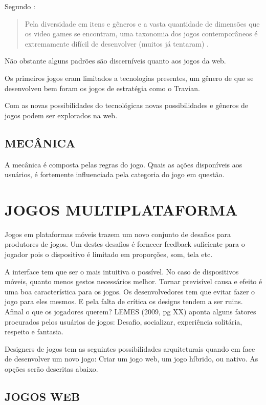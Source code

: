 Segundo \cite[pp. 60]{gamebenefits}:
\begin{quote}
Pela diversidade em itens e gêneros e a vasta quantidade de dimensões
que os video games se encontram, uma taxonomia dos jogos contemporâneos
é extremamente difícil de desenvolver (muitos já tentaram) .
\end{quote}

Não obstante alguns padrões são discerníveis quanto aos jogos da
web.

Os primeiros jogos eram limitados a tecnologias presentes, um gênero de
que se desenvolveu bem foram os jogos de estratégia como o Travian.

Com as novas possibilidades do tecnológicas novas possibilidades e
gêneros de jogos podem ser explorados na web.

\subsection{MECÂNICA}

A mecânica é composta pelas regras do jogo. Quais as ações
disponíveis aos usuários, é fortemente influenciada pela categoria do
jogo em questão.

\section{JOGOS MULTIPLATAFORMA}

Jogos em plataformas móveis trazem um novo conjunto de desafios para
produtores de jogos. Um destes desafios é fornecer feedback suficiente
para o jogador pois o dispositivo é limitado em proporções, som, tela
etc.

A interface tem que ser o mais intuitiva o possível. No caso de
dispositivos móveis, quanto menos gestos necessários melhor. Tornar
previsível causa e efeito é uma boa característica para os jogos.
Os desenvolvedores tem que evitar fazer o jogo para eles mesmos.
E pela falta de crítica os designs tendem a ser ruins. Afinal o
que os jogadores querem? LEMES (2009, pg XX) aponta alguns fatores procurados
pelos usuários de jogos: Desafio, socializar, experiência solitária,
respeito e fantasia.

Designers de jogos tem as seguintes possibilidades arquiteturais
quando em face de desenvolver um novo jogo: Criar um jogo web,
um jogo híbrido, ou nativo. As opções serão descritas abaixo.

\subsection{JOGOS WEB}

